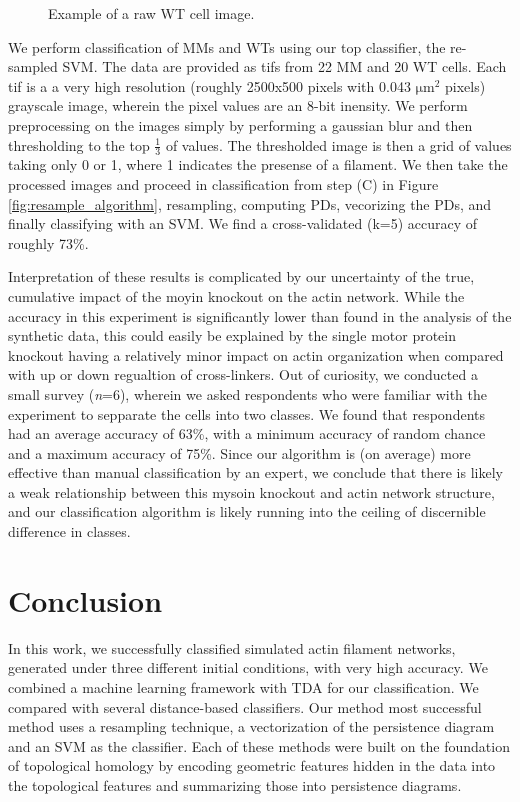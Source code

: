 \documentclass[10pt]{article}
\begin{document}
\begin{figure}[H]
	\begin{center}
	\end{center}
	\caption{Example of a raw WT cell image.}
	\label{fig:wtCell}
\end{figure}

We perform classification of MMs and WTs using our top classifier, the re-sampled SVM. The data are provided as tifs from 22 MM and 20 WT cells. Each tif is a a very high resolution (roughly 2500x500 pixels with 0.043 $\mathrm{\mu m}^2$ pixels) grayscale image, wherein the pixel values are an 8-bit inensity. We perform preprocessing on the images simply by performing a gaussian blur and then thresholding to the top $\frac{1}{3}$ of values. The thresholded image is then a grid of values taking only 0 or 1, where 1 indicates the presense of a filament. We then take the processed images and proceed in classification from step (C) in Figure \ref{fig:resample_algorithm}, resampling, computing PDs, vecorizing the PDs, and finally classifying with an SVM. We find a cross-validated (k=5) accuracy of roughly 73\%.

Interpretation of these results is complicated by our uncertainty of the true, cumulative impact of the moyin knockout on the actin network. While the accuracy in this experiment is significantly lower than found in the analysis of the synthetic data, this could easily be explained by the single motor protein knockout having a relatively minor impact on actin organization when compared with up or down regualtion of cross-linkers. Out of curiosity, we conducted a small survey (\textit{n}=6), wherein we asked respondents who were familiar with the experiment to sepparate the cells into two classes. We found that respondents had an average accuracy of 63\%, with a minimum accuracy of random chance and a maximum accuracy of 75\%. Since our algorithm is (on average) more effective than manual classification by an expert, we conclude that there is likely a weak relationship between this mysoin knockout and actin network structure, and our classification algorithm is likely running into the ceiling of discernible difference in classes.


\section{Conclusion}
In this work, we successfully classified simulated actin filament networks, generated under three different initial conditions, with very high accuracy. We combined a machine learning framework with TDA for our classification. We compared with several distance-based classifiers. Our method most successful method uses a resampling technique, a vectorization of the persistence diagram and an SVM as the classifier. Each of these methods were built on the foundation of topological homology by encoding geometric features hidden in the data into the topological features and summarizing those into persistence diagrams.
\end{document}
